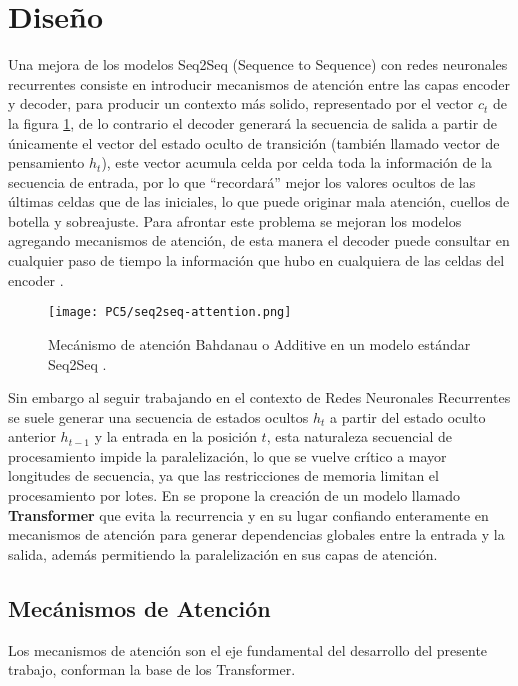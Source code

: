 \documentclass[conference]{IEEEtran}
\begin{document}
\section{Diseño}
Una mejora de los modelos Seq2Seq (Sequence to Sequence) con redes neuronales recurrentes consiste en introducir mecanismos de atención entre las capas encoder y decoder, para producir un contexto más solido, representado por el vector $c_t$ de la figura \ref{fig::seq2seq-attention}, de lo contrario el decoder generará la secuencia de salida a partir de únicamente el vector del estado oculto de transición (también llamado vector de pensamiento $h_t$), este vector acumula celda por celda toda la información de la secuencia de entrada, por lo que \enquote{recordará} mejor los valores ocultos de las últimas celdas que de las iniciales, lo que puede originar mala atención, cuellos de botella y sobreajuste. Para afrontar este problema se mejoran los modelos agregando mecanismos de atención, de esta manera el decoder puede consultar en cualquier paso de tiempo la información que hubo en cualquiera de las celdas del encoder \cite{b1}. 

\begin{figure}[ht]
\centering
\texttt{[image: PC5/seq2seq-attention.png]}
\caption{Mecánismo de atención Bahdanau o Additive en un modelo estándar Seq2Seq \cite{b1}.}
\label{fig::seq2seq-attention}
\end{figure}

Sin embargo al seguir trabajando en el contexto de Redes Neuronales Recurrentes se suele generar una secuencia de estados ocultos $h_t$ a partir del estado oculto anterior $h_{t-1}$ y la entrada en la posición $t$, esta naturaleza secuencial de procesamiento impide la paralelización, lo que se vuelve crítico a mayor longitudes de secuencia, ya que las restricciones de memoria limitan el procesamiento por lotes. En \cite{b4} se propone la creación de un modelo llamado \textbf{Transformer} que evita la recurrencia y en su lugar confiando enteramente en mecanismos de atención para generar dependencias globales entre la entrada y la salida, además permitiendo la paralelización en sus capas de atención. 



\subsection{Mecánismos de Atención}
Los mecanismos de atención son el eje fundamental del desarrollo del presente trabajo, conforman la base de los Transformer.
\end{document}
